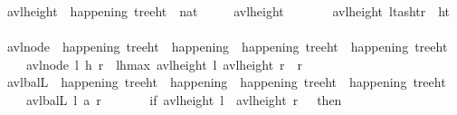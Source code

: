\begin{isabellebody}
\ avl{\isacharunderscore}{\kern0pt}height\ {\isacharcolon}{\kern0pt}{\isacharcolon}{\kern0pt}\ {\isachardoublequoteopen}happening\ tree{\isacharunderscore}{\kern0pt}ht\ {\isasymRightarrow}\ nat{\isachardoublequoteclose}\ \isanewline
\ \ \ \ {\isachardoublequoteopen}avl{\isacharunderscore}{\kern0pt}height\ {\isasymlangle}{\isasymrangle}\ {\isacharequal}{\kern0pt}\ {}{\isachardoublequoteclose}\ \isanewline
\ \ {\isacharbar}{\kern0pt}\ {\isachardoublequoteopen}avl{\isacharunderscore}{\kern0pt}height\ {\isasymlangle}l{\isacharcomma}{\kern0pt}{\isacharparenleft}{\kern0pt}{\isacharparenleft}{\kern0pt}t{\isacharcomma}{\kern0pt}as{\isacharparenright}{\kern0pt}{\isacharcomma}{\kern0pt}ht{\isacharparenright}{\kern0pt}{\isacharcomma}{\kern0pt}r{\isasymrangle}\ {\isacharequal}{\kern0pt}\ ht{\isachardoublequoteclose}\isanewline
\isanewline
\ \ \isamarkupfalse%
\ avl{\isacharunderscore}{\kern0pt}node\ {\isacharcolon}{\kern0pt}{\isacharcolon}{\kern0pt}\ {\isachardoublequoteopen}happening\ tree{\isacharunderscore}{\kern0pt}ht\ {\isasymRightarrow}\ happening\ {\isasymRightarrow}\ happening\ tree{\isacharunderscore}{\kern0pt}ht\ {\isasymRightarrow}\ happening\ tree{\isacharunderscore}{\kern0pt}ht{\isachardoublequoteclose}\ \isanewline
\ \ \ \ {\isachardoublequoteopen}avl{\isacharunderscore}{\kern0pt}node\ l\ h\ r\ {\isacharequal}{\kern0pt}\ {\isasymlangle}l{\isacharcomma}{\kern0pt}{\isacharparenleft}{\kern0pt}h{\isacharcomma}{\kern0pt}{\isacharparenleft}{\kern0pt}max\ {\isacharparenleft}{\kern0pt}avl{\isacharunderscore}{\kern0pt}height\ l{\isacharparenright}{\kern0pt}\ {\isacharparenleft}{\kern0pt}avl{\isacharunderscore}{\kern0pt}height\ r{\isacharparenright}{\kern0pt}\ {\isacharplus}{\kern0pt}\ {}{\isacharparenright}{\kern0pt}{\isacharparenright}{\kern0pt}{\isacharcomma}{\kern0pt}r{\isasymrangle}{\isachardoublequoteclose}\isanewline
\isanewline
\ \ \isamarkupfalse%
\ avl{\isacharunderscore}{\kern0pt}balL\ {\isacharcolon}{\kern0pt}{\isacharcolon}{\kern0pt}\ {\isachardoublequoteopen}happening\ tree{\isacharunderscore}{\kern0pt}ht\ {\isasymRightarrow}\ happening\ {\isasymRightarrow}\ happening\ tree{\isacharunderscore}{\kern0pt}ht\ {\isasymRightarrow}\ happening\ tree{\isacharunderscore}{\kern0pt}ht{\isachardoublequoteclose}\ \isanewline
\ \ \ \ {\isachardoublequoteopen}avl{\isacharunderscore}{\kern0pt}balL\ l\ a\ r\ {\isacharequal}{\kern0pt}\isanewline
\ \ \ \ \ \ {\isacharparenleft}{\kern0pt}if\ avl{\isacharunderscore}{\kern0pt}height\ l\ {\isacharequal}{\kern0pt}\ avl{\isacharunderscore}{\kern0pt}height\ r\ {\isacharplus}{\kern0pt}\ {}\ then\isanewline

\end{isabellebody}
